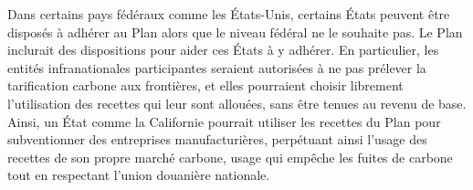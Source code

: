 \documentclass[a5paper,french,openany]{memoir}
\begin{document}

Dans certains pays fédéraux comme les États-Unis, certains États peuvent être disposés à adhérer au Plan alors que le niveau fédéral ne le souhaite pas. Le Plan inclurait des dispositions pour aider ces États à y adhérer. En particulier, les entités infranationales participantes seraient autorisées à ne pas prélever la tarification carbone aux frontières, et elles pourraient choisir librement l'utilisation des recettes qui leur sont allouées, sans être tenues au revenu de base. 
Ainsi, un État comme la Californie pourrait utiliser les recettes du Plan pour subventionner des entreprises manufacturières, perpétuant ainsi l'usage des recettes de son propre marché carbone, usage qui empêche les fuites de carbone tout en respectant l'union douanière nationale.
\end{document}
